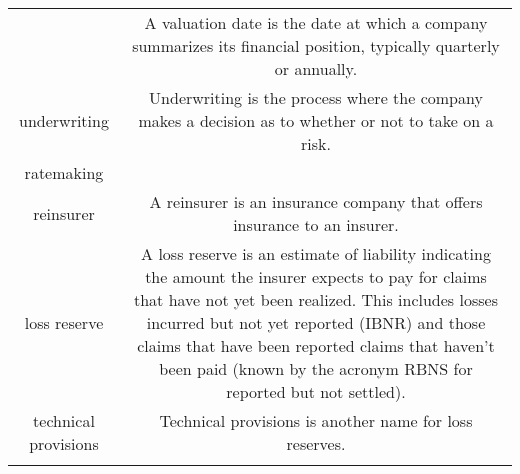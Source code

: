 \documentclass[
]{book}
\begin{document}
\begin{longtable}[]{@{}cc@{}}
\begin{minipage}[t]{0.39\columnwidth}
\end{minipage} & \begin{minipage}[t]{0.43\columnwidth}\centering
A valuation date is the date
at which a company summarizes
its financial position,
typically quarterly or
annually.\strut
\end{minipage}\tabularnewline
\begin{minipage}[t]{0.39\columnwidth}\centering
underwriting\strut
\end{minipage} & \begin{minipage}[t]{0.43\columnwidth}\centering
Underwriting is the process
where the company makes a
decision as to whether or not
to take on a risk.\strut
\end{minipage}\tabularnewline
\begin{minipage}[t]{0.39\columnwidth}\centering
ratemaking\strut
\end{minipage} & \begin{minipage}[t]{0.43\columnwidth}\centering
\strut
\end{minipage}\tabularnewline
\begin{minipage}[t]{0.39\columnwidth}\centering
reinsurer\strut
\end{minipage} & \begin{minipage}[t]{0.43\columnwidth}\centering
A reinsurer is an insurance
company that offers insurance
to an insurer.\strut
\end{minipage}\tabularnewline
\begin{minipage}[t]{0.39\columnwidth}\centering
loss reserve\strut
\end{minipage} & \begin{minipage}[t]{0.43\columnwidth}\centering
A loss reserve is an estimate
of liability indicating the
amount the insurer expects to
pay for claims that have not
yet been realized. This
includes losses incurred but
not yet reported (IBNR) and
those claims that have been
reported claims that haven't
been paid (known by the
acronym RBNS for reported but
not settled).\strut
\end{minipage}\tabularnewline
\begin{minipage}[t]{0.39\columnwidth}\centering
technical provisions\strut
\end{minipage} & \begin{minipage}[t]{0.43\columnwidth}\centering
Technical provisions is
another name for loss
reserves.\strut
\end{minipage}\tabularnewline
\begin{minipage}[t]{0.39\columnwidth}\centering

\end{minipage}
\end{longtable}
\end{document}
